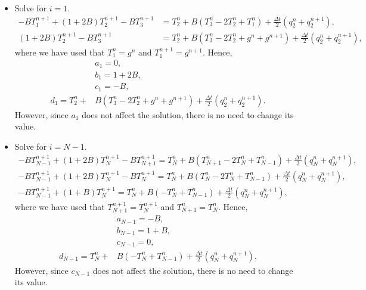 \begin{itemize}
\item Solve for $i=1$.
\begin{align*}
-BT_{1}^{n+1}+(1+2B)T_2^{n+1}-BT_{3}^{n+1}&=T_2^n+B\left(T_{3}^n-2T_{2}^n+T_{1}^n\right)+\frac{\Delta t}{2}\left(q_2^n+q_2^{n+1}\right),\\
(1+2B)T_2^{n+1}-BT_{3}^{n+1}&=T_2^n+B\left(T_{3}^n-2T_{2}^n+g^n+g^{n+1}\right)+\frac{\Delta t}{2}\left(q_2^n+q_2^{n+1}\right),
\end{align*}
where we have used that $T_1^n=g^n$ and $T_1^{n+1}=g^{n+1}$. Hence,
\begin{align*}
&a_1=0,\\
&b_1=1+2B,\\
&c_1=-B,\\
d_1=T_2^n+&B\left(T_{3}^n-2T_{2}^n+g^n+g^{n+1}\right)+\frac{\Delta t}{2}\left(q_2^n+q_2^{n+1}\right).
\end{align*}
However, since $a_1$ does not affect the solution, there is no need to change its value.
\item Solve for $i=N-1$.
\begin{align*}
-BT_{N-1}^{n+1}+(1+2B)T_N^{n+1}-BT_{N+1}^{n+1}=T_N^n+B\left(T_{N+1}^n-2T_{N}^n+T_{N-1}^n\right)+\frac{\Delta t}{2}\left(q_N^n+q_N^{n+1}\right),\\
-BT_{N-1}^{n+1}+(1+2B)T_N^{n+1}-BT_{N}^{n+1}=T_N^n+B\left(T_{N}^n-2T_{N}^n+T_{N-1}^n\right)+\frac{\Delta t}{2}\left(q_N^n+q_N^{n+1}\right),\\
-BT_{N-1}^{n+1}+(1+B)T_N^{n+1}=T_N^n+B\left(-T_{N}^n+T_{N-1}^n\right)+\frac{\Delta t}{2}\left(q_N^n+q_N^{n+1}\right),
\end{align*}
where we have used that $T_{N+1}^{n+1}=T_N^{n+1}$ and $T_{N+1}^n=T_N^n$. Hence,
\begin{align*}
&a_{N-1}=-B,\\
&b_{N-1}=1+B,\\
&c_{N-1}=0,\\
d_{N-1}=T_N^n+&B\left(-T_{N}^n+T_{N-1}^n\right)+\frac{\Delta t}{2}\left(q_N^n+q_N^{n+1}\right).
\end{align*}
However, since $c_{N-1}$ does not affect the solution, there is no need to change its value.
\end{itemize}
